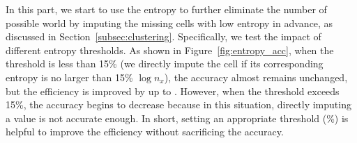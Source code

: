 %
In this part, we start to use the entropy to further eliminate the number of possible world by imputing the missing cells with low entropy in advance, as discussed in Section~\ref{subsec:clustering}. 
%
Specifically, we test the impact of different entropy thresholds. As shown in Figure~\ref{fig:entropy_acc}, when the threshold is less than  15\% (\ie we directly impute the cell if its corresponding entropy is no larger than 15\% $\log n_x$), the accuracy almost remains unchanged, but the efficiency is improved by up to . However, when the threshold exceeds 15\%, the accuracy begins to decrease because in this situation, directly imputing a value is not accurate enough. In short, setting an appropriate threshold (\%) is helpful to improve the efficiency without sacrificing the accuracy. 


%
